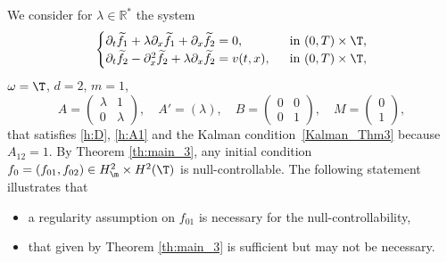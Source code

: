 We consider for $\lambda\in\mathbb{R}^*$ the system\vspace*{-3pt}
\begin{equation} \label{c-ex_parab}
\begin{cases}
\partial_t \widetilde{f}_1 + \lambda \partial_x \widetilde{f}_1 + \partial_x \widetilde{f}_2 = 0, &\ \text{ in } (0,T)\times\T, \\
\partial_t \widetilde{f}_2 - \partial_x^2 \widetilde{f}_2 + \lambda \partial_x \widetilde{f}_2 = v(t,x), &\ \text{ in } (0,T)\times\T,
\end{cases}
\end{equation}
\ie $\omega=\T$, $d=2$, $m=1$,\vspace*{-3pt}\enlargethispage{.5\baselineskip}%
\[
A=\begin{pmatrix}
\lambda & 1 \\ 0 & \lambda
\end{pmatrix},\quad
A'=(\lambda), \quad
B=\begin{pmatrix}
0 & 0 \\ 0 & 1
\end{pmatrix},\quad
M=\begin{pmatrix}
0 \\ 1
\end{pmatrix},
\]
that satisfies \eqref{h:D}, \eqref{h:A1} and the Kalman condition~\eqref{Kalman_Thm3} because $A_{12}=1$.
By Theorem \ref{th:main_3}, any initial condition $f_0=(f_{01},f_{02})\in H^{2}_\m \times H^2(\T)$ is null-controllable.
The following statement illustrates that
\begin{itemize}
\item a regularity assumption on $f_{01}$ is necessary for the null-controllability,
\item that given by Theorem \ref{th:main_3} is sufficient but may not be necessary.
\end{itemize}

